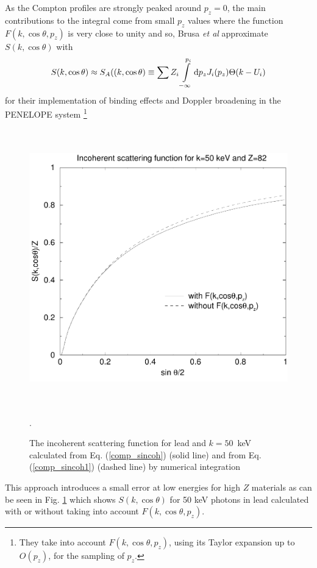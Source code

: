 As the Compton profiles are 
strongly peaked around $p_z=0$, the main contributions 
to the integral come from small $p_z$ values where 
the function $F(k,\cos \theta, p_z)$ is very close 
to unity and so, Brusa {\em et al} \cite{BS96} approximate 
$S(k,\cos \theta)$ with 
\begin{equation}
\label{comp_sincoh1}
S(k,\cos \theta) \approx S_A((k,\cos \theta) \equiv 
\sum Z_i \int\limits_{-\infty}^{p_i} {\rm d} p_z J_i(p_z)
\Theta(k - U_i)
\end{equation}
for their implementation of binding effects and Doppler broadening 
in the PENELOPE system \cite{Sa96}\footnote{They take 
into account $F(k,\cos \theta, p_z)$, using its Taylor 
expansion up to $O(p_z)$, for the sampling of $p_z$.}
\begin{figure}[h]
\includegraphics[height=12cm,width=12cm]{figures/sincoh}
\caption[Incoherent scattering function]{\label{comp_sincoh_fig}
The incoherent scattering function for lead and $k=50$~keV 
calculated from Eq. (\protect\ref{comp_sincoh}) (solid line) 
and from Eq. (\protect\ref{comp_sincoh1}) (dashed line) 
by numerical integration}.
\end{figure}
This approach introduces a small error at low energies 
for high $Z$ materials as can be seen 
in Fig. \ref{comp_sincoh_fig} which shows 
$S(k,\cos \theta)$ for 50 keV photons in lead calculated 
with or without taking into account $F(k,\cos \theta, p_z)$.

